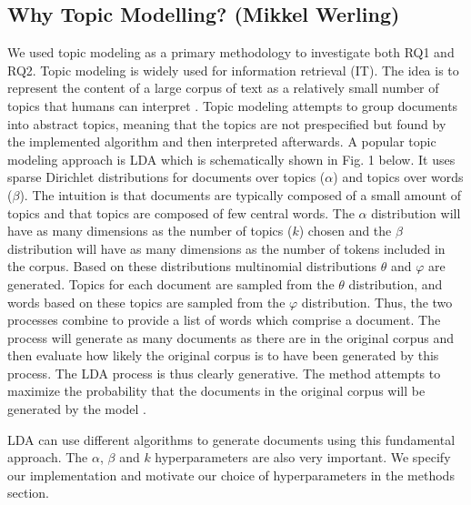 \documentclass{article}
\begin{document}
    \subsection{Why Topic Modelling? (Mikkel Werling)}
    We used topic modeling as a primary methodology to investigate both RQ1 and RQ2. Topic modeling is widely used for information retrieval (IT). The idea is to represent the content of a large corpus of text as a relatively small number of topics that humans can interpret \cite{arun2010finding}. Topic modeling attempts to group documents into abstract topics, meaning that the topics are not prespecified but found by the implemented algorithm and then interpreted afterwards. 
A popular topic modeling approach is LDA \cite{arun2010finding,cao2009density} which is schematically shown in Fig. 1 below. It uses sparse Dirichlet distributions for documents over topics ($\alpha$) and topics over words ($\beta$). The intuition is that documents are typically composed of a small amount of topics and that topics are composed of few central words. The $\alpha$ distribution will have as many dimensions as the number of topics ($k$) chosen and the $\beta$ distribution will have as many dimensions as the number of tokens included in the corpus. Based on these distributions multinomial distributions $\theta$ and $\varphi$ are generated. Topics for each document are sampled from the $\theta$ distribution, and words based on these topics are sampled from the $\varphi$ distribution. Thus, the two processes combine to provide a list of words which comprise a document. The process will generate as many documents as there are in the original corpus and then evaluate how likely the original corpus is to have been generated by this process. The LDA process is thus clearly generative. The method attempts to maximize the probability that the documents in the original corpus will be generated by the model \cite{cao2009density}.

LDA can use different algorithms to generate documents using this fundamental approach. The $\alpha$, $\beta$ and $k$ hyperparameters are also very important. We specify our implementation and motivate our choice of hyperparameters in the methods section. 
\end{document}
